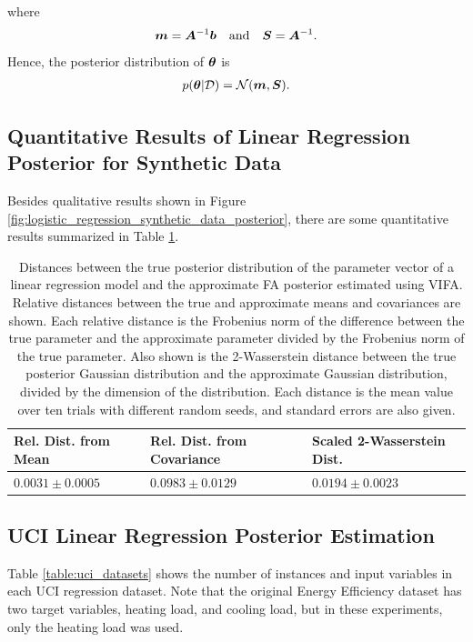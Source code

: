 \documentclass[10pt]{article} %
\begin{document}
where
\begin{equation}
	{\bm{m}} = {\bm{A}}^{-1} {\bm{b}}
	\quad \text{and} \quad 
	{\bm{S}} = {\bm{A}}^{-1}.
\end{equation}
Hence, the posterior distribution of ${\bm{\theta}}$ is 
\begin{align}
\begin{split}
	p({\bm{\theta}} | \mathcal{D}) = \mathcal{N}({\bm{m}}, {\bm{S}}).
\end{split}
\end{align}


\subsection{Quantitative Results of Linear Regression Posterior for Synthetic Data}
\label{app:quantitative_results_linear_regression_posterior}
Besides qualitative results shown in Figure \ref{fig:logistic_regression_synthetic_data_posterior}, there are some quantitative results summarized in Table \ref{table:linear_regression_vi_posterior}.

\begin{table}[h!]
\caption{Distances between the true posterior distribution of the parameter vector of a linear regression model and the approximate FA posterior estimated using VIFA. Relative distances between the true and approximate means and covariances are shown. Each relative distance is the Frobenius norm of the difference between the true parameter and the approximate parameter divided by the Frobenius norm of the true parameter. Also shown is the 2-Wasserstein distance between the true posterior Gaussian distribution and the approximate Gaussian distribution, divided by the dimension of the distribution. Each distance is the mean value over ten trials with different random seeds, and standard errors are also given.}
\begin{center}
\begin{tabular}{lll}
\label{table:linear_regression_vi_posterior}
\textbf{Rel. Dist. from Mean} & \textbf{Rel. Dist. from Covariance} & \textbf{Scaled 2-Wasserstein Dist.} \\ \hline
$0.0031 \pm 0.0005$ 	& $0.0983 \pm 0.0129$ 	& $0.0194 \pm 0.0023$ \\ 
\end{tabular}
\end{center}
\end{table}

\subsection{UCI Linear Regression Posterior Estimation}
\label{app:uci_posterior}
Table \ref{table:uci_datasets} shows the number of instances and input variables in each UCI regression dataset. Note that the original Energy Efficiency dataset has two target variables, heating load, and cooling load, but in these experiments, only the heating load was used.
\end{document}
